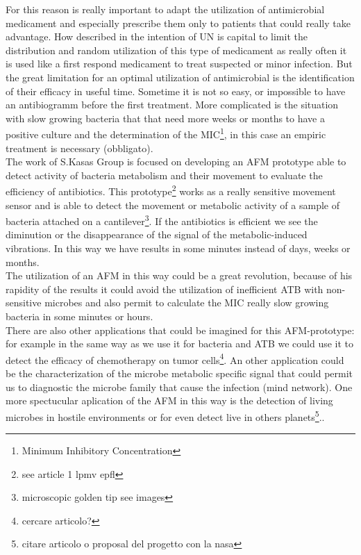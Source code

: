 \documentclass[11pt, a4paper]{article}
\begin{document}
For this reason is really important to adapt the utilization of antimicrobial medicament and especially prescribe them only to patients that could really take advantage. How described in the intention of UN is capital to limit the distribution and random utilization of this type of medicament as really often it is used like a first respond medicament to treat suspected or minor infection. 
But the great limitation for an optimal utilization %
of antimicrobial is the identification of their efficacy in useful time. Sometime it is not so easy, or impossible to have an antibiogramm before the first treatment. More complicated is the situation with slow  growing bacteria that that need more weeks or months to have a positive culture and the determination of the MIC\footnote{Minimum Inhibitory Concentration}, in this case an empiric treatment is necessary (obbligato).
\\
The work of S.Kasas Group is focused on developing an AFM prototype able to detect activity of bacteria metabolism and their movement to evaluate the efficiency of antibiotics. This prototype\footnote{see article 1 lpmv epfl} works as a really sensitive movement sensor and is able to detect the movement or metabolic activity of a sample of bacteria attached on a cantilever\footnote{microscopic golden tip see images}.
If the antibiotics is efficient we see the diminution or the disappearance of the signal of the metabolic-induced vibrations. In this way we have results in some minutes instead of days, weeks or months. 
\\
The utilization of an AFM in this way could be a great revolution, because of his rapidity of the results it could avoid the utilization of inefficient ATB with non-sensitive microbes and also permit to calculate the MIC really slow growing bacteria in some minutes or hours.  
\\
There are also other applications that could be imagined for this AFM-prototype: for example in the same way as we use it for bacteria and ATB we could use it to detect the efficacy of chemotherapy on tumor cells\footnote{cercare articolo?}\cite{articolosconosiuto1}. An other application could be the characterization of the microbe metabolic specific signal that could permit us to diagnostic the microbe family that cause the infection (mind network). 
One more spectucular aplication of the AFM in this way is the detection of living microbes in hostile environments or for even detect live in others planets\footnote{citare articolo o proposal del progetto con la nasa}.\cite{articolosconosciuto1}. 
\end{document}
